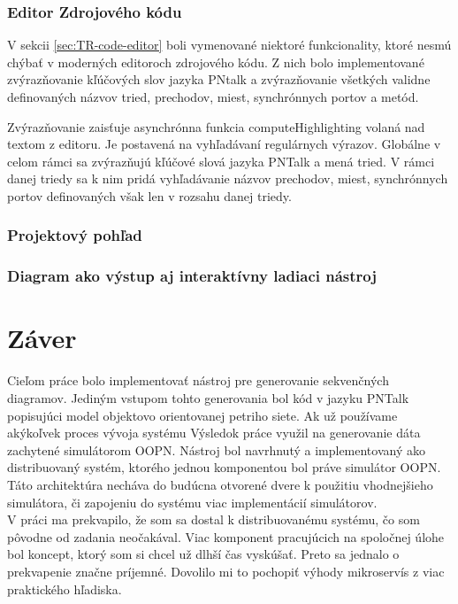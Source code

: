 \subsection{Editor Zdrojového kódu}

V sekcii \ref{sec:TR-code-editor} boli vymenované niektoré funkcionality, ktoré nesmú chýbať v moderných editoroch zdrojového kódu. Z nich bolo implementované zvýrazňovanie kľúčových slov jazyka PNtalk a zvýrazňovanie všetkých validne definovaných názvov tried, prechodov, miest, synchrónnych portov a metód.

Zvýrazňovanie zaisťuje asynchrónna funkcia computeHighlighting volaná nad textom z editoru. Je postavená na vyhľadávaní regulárnych výrazov. Globálne v celom rámci sa zvýrazňujú kľúčové slová jazyka PNTalk a mená tried. V rámci danej triedy sa k nim pridá vyhľadávanie názvov prechodov, miest, synchrónnych portov definovaných však len v rozsahu danej triedy.

\subsection{Projektový pohľad}

\subsection{Diagram ako výstup aj interaktívny ladiaci nástroj}

\chapter{Záver}

Cieľom práce bolo implementovať nástroj pre generovanie sekvenčných diagramov. Jediným vstupom tohto generovania bol kód v jazyku PNTalk popisujúci model objektovo orientovanej petriho siete. Ak už používame akýkoľvek proces vývoja systému Výsledok práce využil na generovanie dáta zachytené simulátorom OOPN. Nástroj bol navrhnutý a implementovaný ako distribuovaný systém, ktorého jednou komponentou bol práve simulátor OOPN. Táto architektúra necháva do budúcna otvorené dvere k použitiu vhodnejšieho simulátora, či zapojeniu do systému viac implementácií simulátorov. \\

V práci ma prekvapilo, že som sa dostal k distribuovanému systému, čo som pôvodne od zadania neočakával. Viac komponent pracujúcich na spoločnej úlohe bol koncept, ktorý som si chcel už dlhší čas vyskúšať. Preto sa jednalo o prekvapenie značne príjemné. Dovolilo mi to pochopiť výhody mikroservís z viac praktického hľadiska. \\

